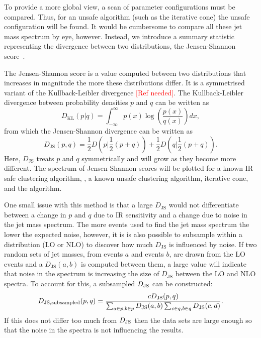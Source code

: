     To provide a more global view, a scan of parameter configurations must be compared.
    Thus, for an unsafe algorithm (such as the iterative cone) the unsafe configuration
    will be found.
    It would be cumbersome to compare all these jet mass spectrum by eye, however.
    Instead, we introduce a summary statistic representing the divergence between two distributions,
    the Jensen-Shannon score~\cite{jensen_shannon}.

    The Jensen-Shannon score is a value computed between two distributions that increases in magnitude the more these distributions differ.
    It is a symmetrised variant of the Kullback-Leibler divergence {\textcolor{red}{[Ref needed]}}.
    The Kullback-Leibler divergence between probability densities \(p\) and \(q\) can be written as
    \begin{equation}
    D_\text{KL} (p | q) = \int^{\infty}_{-\infty} p(x) \log\left(\frac{p(x)}{q(x)}\right) dx,
\end{equation}
    from which the Jensen-Shannon divergence can be written as
    \begin{equation}
    D_\text{JS}(p, q) = \frac{1}{2}D\left(p | \frac{1}{2}(p + q)\right) + \frac{1}{2}D\left(q | \frac{1}{2}(p + q)\right).
\end{equation}
    Here, \(D_\text{JS}\) treats \(p\) and \(q\) symmetrically and will grow as they become more different.
    The spectrum of Jensen-Shannon scores will be plotted for a known IR safe clustering algorithm, \antikt{},
    a known unsafe clustering algorithm, iterative cone, and the \spectral{} algorithm.

    One small issue with this method is that a large \(D_\text{JS}\) would not differentiate
    between a change in \(p\) and \(q\) due to IR sensitivity and 
    a change due to noise in the jet mass spectrum.
    The more events used to find the jet mass spectrum the lower the expected noise,
    however, it is is also possible to subsample within a distribution (LO or NLO)
    to discover how much \(D_\text{JS}\) is influenced by noise.
    If two random sets of jet masses, from events \(a\) and events \(b\), are drawn from the LO events 
    and a \(D_\text{JS}(a, b)\) is computed between them, a large value will indicate that 
    noise in the spectrum is increasing the size of \(D_\text{JS}\) between the LO and NLO spectra.
    To account for this, a subsampled \(D_{\rm JS}\) can be constructed:
    \begin{equation}
    D_{\rm JS, subsampled}(p, q) = \frac{cD_{\rm JS}(p, q)}{\sum_{a \in p, b \in p} D_{\rm JS}(a, b)\sum_{c \in q, b \in q} D_{\rm JS}(c, d)}.
\end{equation}
    If this does not differ too much from \(D_{\rm JS}\) then the data sets are large enough so that the noise in
    the spectra is not influencing the results.

